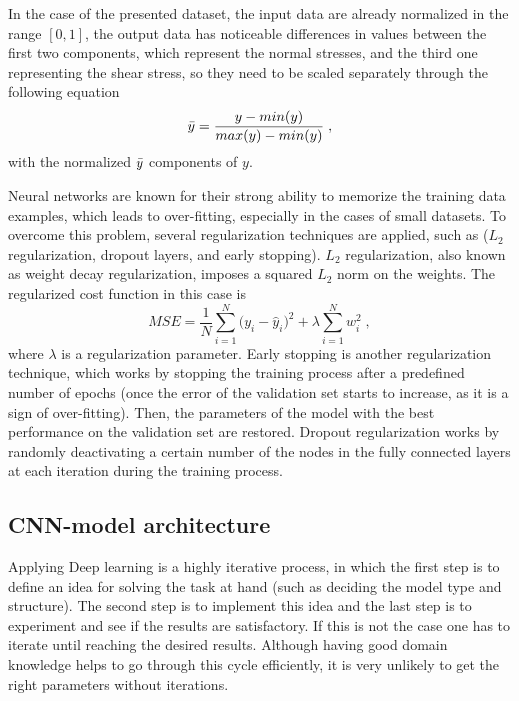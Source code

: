 \documentclass[final,3p,times]{elsarticle}
\begin{document}
In the case of the presented dataset, the input data are already normalized in the range $[0,1]$, the output data has noticeable differences in values between the first two components, which represent the normal stresses, and the third one representing the shear stress, so they need to be scaled separately through the following equation
\begin{equation}
\Bar{y} = \frac{y - min(y)}{max(y)-min(y)} \; ,
\end{equation}
with the normalized $\Bar{y}$ components of $y$.

Neural networks are known for their strong ability to memorize the training data examples, which leads to over-fitting, especially in the cases of small datasets. To overcome this problem, several regularization techniques are applied, such as ($L_2$ regularization, dropout layers, and early stopping). $L_2$ regularization, also known as weight decay regularization, imposes a squared $L_2$ norm on the weights. The regularized cost function in this case is 
\begin{equation}
MSE =  {\frac{1}{N}\sum_{i=1}^{N} \big(y_{i} - \widehat{y}_i\big)^2} + \lambda \sum_{i=1}^{N} w_i^2 \; ,
\end{equation}
where $\lambda$ is a regularization parameter. Early stopping is another regularization technique, which works by stopping the training process after a predefined number of epochs (once the error of the validation set starts to increase, as it is a sign of over-fitting). Then, the parameters of the model with the best performance on the validation set are restored. Dropout regularization works by randomly deactivating a certain number of the nodes in the fully connected layers at each iteration during the training process.


\subsection{CNN-model architecture}
Applying Deep learning is a highly iterative process, in which the first step is to define an idea for solving the task at hand (such as deciding the model type and structure). The second step is to implement this idea and the last step is to experiment and see if the results are satisfactory. If this is not the case one has to iterate until reaching the desired results. Although having good domain knowledge helps to go through this cycle efficiently, it is very unlikely to get the right parameters without iterations. 
\end{document}
